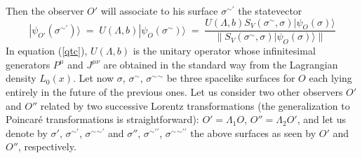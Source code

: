 \documentclass[12pt]{article}
\begin{document}
Then the observer $O'$ will associate to his surface
$\sigma{}^{\sim\prime}$ the statevector
\begin{equation} \label{qtc}
|\psi_{O'}(\sigma{}^{\sim\prime})\rangle \; = \; U(\Lambda, b)
|\psi_{O}(\sigma{}^{\sim})\rangle \; = \; \frac{ U(\Lambda, b)
S_{V}(\sigma{}^{\sim}, \sigma) |\psi_{O}(\sigma)\rangle}{\|
S_{V}(\sigma{}^{\sim}, \sigma) |\psi_{O}(\sigma)\rangle\|}
\end{equation}
In equation (\ref{qtc}), $U(\Lambda, b)$ is the unitary operator
whose infinitesimal generators $P^{\mu}$ and $J^{\mu\nu}$ are
obtained in the standard way from the Lagrangian density
$L_{0}(x)$. Let now $\sigma$, $\sigma{}^{\sim}$,
$\sigma{}^{\sim}{}^{\sim}$ be three spacelike surfaces for $O$
each lying entirely in the future of the previous ones. Let us
consider two other observers $O'$ and $O''$ related by two
successive Lorentz transformations (the generalization to
Poincar\'e transformations is straightforward): $O' = \Lambda_{1}
O$, $O'' = \Lambda_{2} O'$, and let us denote by $\sigma'$,
$\sigma{}^{\sim\prime}$, $\sigma{}^{\sim}{}^{\sim\prime}$ and
$\sigma''$, $\sigma{}^{\sim\prime\prime}$,
$\sigma{}^{\sim}{}^{\sim\prime\prime}$ the above surfaces as seen
by $O'$ and $O''$, respectively.
\end{document}
